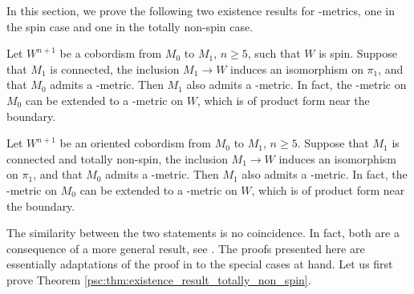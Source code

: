 
In this section, we prove the following two existence results for \psc-metrics, one in the spin case and one in the totally non-spin case.

\begin{theorem}
    \label{psc:thm:existence_result_spin}
    Let $W^{n+1}$ be a cobordism from $M_0$ to $M_1$, $n \geq 5$, such that $W$ is spin. Suppose that $M_1$ is connected, the inclusion $M_1 \to W$ induces an isomorphism on $\pi_1$, and that $M_0$ admits a \psc-metric. Then $M_1$ also admits a \psc-metric. In fact, the \psc-metric on $M_0$ can be extended to a \psc-metric on $W$, which is of product form near the boundary. 
\end{theorem}

\begin{theorem}
    \label{psc:thm:existence_result_totally_non_spin}
    Let $W^{n+1}$ be an oriented cobordism from $M_0$ to $M_1$, $n \geq 5$. Suppose that $M_1$ is connected and totally non-spin, the inclusion $M_1 \to W$ induces an isomorphism on $\pi_1$, and that $M_0$ admits a \psc-metric. Then $M_1$ also admits a \psc-metric. In fact, the \psc-metric on $M_0$ can be extended to a \psc-metric on $W$, which is of product form near the boundary. 
\end{theorem}

The similarity between the two statements is no coincidence. In fact, both are a consequence of a more general result, see \cite[Theorem 1.5]{FrenckEbertChernysh}. The proofs presented here are essentially adaptations of the proof in \cite{FrenckEbertChernysh} to the special cases at hand. Let us first prove Theorem \ref{psc:thm:existence_result_totally_non_spin}.

